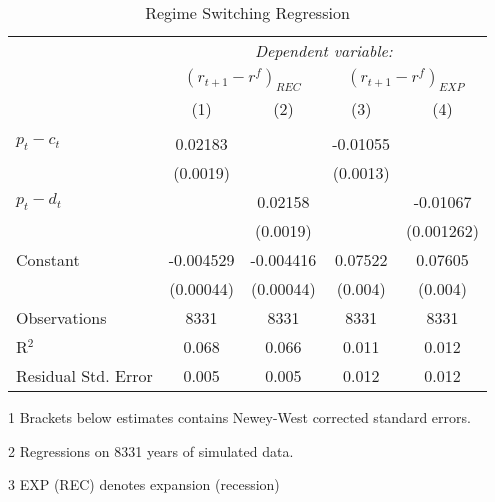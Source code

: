 \begin{table}[H]
\centering   
  \caption{Regime Switching Regression}           
  \label{tab:RSregress}     
  \begin{threeparttable}
\begin{tabular}{@{\hspace{5pt}}l@{\hspace{5pt}}cccc} 
\toprule 
 & \multicolumn{4}{c}{\textit{Dependent variable:}} \\ 
 & \multicolumn{2}{c}{$\left(r_{t+1}-r^f\right)_{REC}$} & \multicolumn{2}{c}{$\left(r_{t+1}-r^f\right)_{EXP}$} \\ 
 \cmidrule(rr){2-5}
 & (1)   &   (2) & (3) & (4) \\ 
\midrule  
\\[-2.1ex] $ p_t - c_t $ & 0.02183&  &-0.01055   & \\ 
  & (0.0019) & &(0.0013) & \\ 
 \addlinespace 
 $p_t - d_t$ &  & 0.02158 & &-0.01067 \\
 & & (0.0019) & &(0.001262) \\
 \addlinespace 
 Constant &-0.004529 &-0.004416 &0.07522 &0.07605 \\ 
  &(0.00044) &(0.00044) &(0.004) &(0.004) \\ 
 \addlinespace 
\midrule  
Observations & 8331 & 8331 & 8331 &8331\\ 
R$^{2}$ &0.068 & 0.066 & 0.011 &0.012\\ 
Residual Std. Error &0.005 & 0.005 &0.012 & 0.012  \\ 
\bottomrule 
\end{tabular} 
\begin{tablenotes}
\footnotesize{
\item[1] Brackets below estimates contains Newey-West corrected standard errors. 
\item[2] Regressions on 8331 years of simulated data.
\item[3] EXP (REC) denotes expansion (recession)
}
\end{tablenotes}
\end{threeparttable}
\end{table} 
